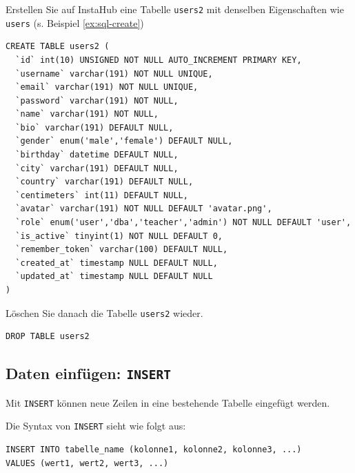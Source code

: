 \begin{myexercise}\label{aufg:a-sql-insert}
  Erstellen Sie auf InstaHub eine Tabelle \texttt{users2} mit denselben Eigenschaften wie \texttt{users} (s. Beispiel \ref{ex:sql-create})
  \begin{myanswer}
    \begin{lstlisting}[style=sql]
CREATE TABLE users2 (
  `id` int(10) UNSIGNED NOT NULL AUTO_INCREMENT PRIMARY KEY,
  `username` varchar(191) NOT NULL UNIQUE,
  `email` varchar(191) NOT NULL UNIQUE,
  `password` varchar(191) NOT NULL,
  `name` varchar(191) NOT NULL,
  `bio` varchar(191) DEFAULT NULL,
  `gender` enum('male','female') DEFAULT NULL,
  `birthday` datetime DEFAULT NULL,
  `city` varchar(191) DEFAULT NULL,
  `country` varchar(191) DEFAULT NULL,
  `centimeters` int(11) DEFAULT NULL,
  `avatar` varchar(191) NOT NULL DEFAULT 'avatar.png',
  `role` enum('user','dba','teacher','admin') NOT NULL DEFAULT 'user',
  `is_active` tinyint(1) NOT NULL DEFAULT 0,
  `remember_token` varchar(100) DEFAULT NULL,
  `created_at` timestamp NULL DEFAULT NULL,
  `updated_at` timestamp NULL DEFAULT NULL
)
\end{lstlisting}
  \end{myanswer}
\end{myexercise}

\begin{myexercise}
  Löschen Sie danach die Tabelle \texttt{users2} wieder.
  \begin{myanswer}
    \begin{lstlisting}[style=sql]
DROP TABLE users2
\end{lstlisting}
  \end{myanswer}
\end{myexercise}


\subsection{Daten einfügen: \texorpdfstring{\lstinline[style=sql]|INSERT|}{INSERT}}

Mit \lstinline[style=sql]|INSERT| können neue Zeilen in eine bestehende Tabelle eingefügt werden.

Die Syntax von \lstinline[style=sql]|INSERT| sieht wie folgt aus:

\begin{lstlisting}[style=sql]
INSERT INTO tabelle_name (kolonne1, kolonne2, kolonne3, ...)
VALUES (wert1, wert2, wert3, ...)
\end{lstlisting}

